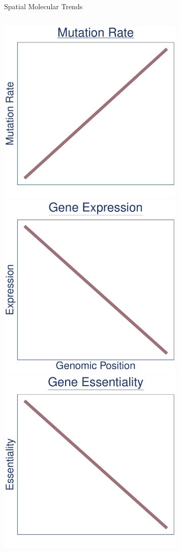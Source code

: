 \documentclass{beamer}
\begin{document}
\begin{frame}{Spatial Molecular Trends}
	\begin{columns}[t]
		\centering
		\includegraphics[width=0.67\textwidth]{./mut_graph.pdf}\\
		\includegraphics[width=0.67\textwidth]{./exp_graph.pdf}
		\centering
		\includegraphics[width=0.67\textwidth]{./ess_graph.pdf}\\

\end{columns}
\end{frame}
\end{document}
